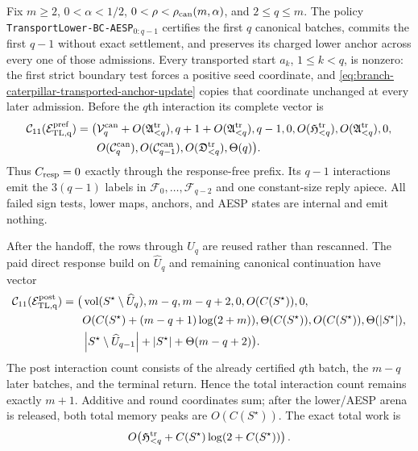 \begin{theorem}
\label{thm:branch-caterpillar-transported-lower-handoff}
Fix $m\geq2$, $0<\alpha<1/2$,
$0<\rho<\rho_{\rm can}(m,\alpha)$, and $2\leq q\leq m$.
The policy
\texttt{TransportLower-BC-AESP}$_{0:q-1}$ certifies the first $q$
canonical batches, commits the first $q-1$ without exact settlement, and
preserves its charged lower anchor across every one of those admissions.
Every transported start $a_k$, $1\leq k<q$, is nonzero: the first strict
boundary test forces a positive seed coordinate, and
\cref{eq:branch-caterpillar-transported-anchor-update} copies that coordinate
unchanged at every later admission.
Before the $q$th interaction its complete vector is
\begin{equation}
 \begin{aligned}
 \mathcal C_{11}(\mathcal E_{\rm TL,q}^{\rm pref})=\bigl(&
 \mathcal V_q^{\rm can}+O(\mathfrak A_{<q}^{\rm tr}),
 q+1+O(\mathfrak A_{<q}^{\rm tr}),q-1,0,
 O(\mathfrak H_{<q}^{\rm tr}),
 O(\mathfrak A_{<q}^{\rm tr}),0,\\
 &O(\mathcal C_q^{\rm can}),
 O(\mathcal C_{q-1}^{\rm can}),
 O(\mathfrak D_{<q}^{\rm tr}),\Theta(q)\bigr).
 \end{aligned}
 \label{eq:branch-caterpillar-transported-lower-prefix-eleven-vector}
\end{equation}
Thus $C_{\rm resp}=0$ exactly through the response-free prefix.  Its
$q-1$ interactions emit the $3(q-1)$ labels in
$\mathcal F_0,\ldots,\mathcal F_{q-2}$ and one constant-size reply apiece.
All failed sign tests, lower maps, anchors, and AESP states are internal and
emit nothing.

After the handoff, the rows through $\widehat U_q$ are reused rather than
rescanned.  The paid direct response build on $\widehat U_q$ and remaining
canonical continuation have vector
\begin{equation}
 \begin{aligned}
 \mathcal C_{11}(\mathcal E_{\rm TL,q}^{\rm post})=\bigl(&
 \operatorname{vol}(S^\star\setminus\widehat U_q),m-q,m-q+2,0,
 O(C(S^\star)),0,\\
 &O(C(S^\star)+(m-q+1)\log(2+m)),
 \Theta(C(S^\star)),O(C(S^\star)),
 \Theta(\left\lvert S^\star \right\rvert),\\
 &\left\lvert S^\star\setminus\widehat U_{q-1} \right\rvert
  +\left\lvert S^\star \right\rvert+\Theta(m-q+2)\bigr).
 \end{aligned}
 \label{eq:branch-caterpillar-transported-lower-post-eleven-vector}
\end{equation}
The post interaction count consists of the already certified $q$th batch,
the $m-q$ later batches, and the terminal return.  Hence the total interaction
count remains exactly $m+1$.  Additive and round coordinates sum; after the
lower/AESP arena is released, both total memory peaks are
$O(C(S^\star))$.  The exact total work is
\begin{equation}
 O\!\left(\mathfrak H_{<q}^{\rm tr}
       +C(S^\star)\log(2+C(S^\star))\right).
 \label{eq:branch-caterpillar-transported-lower-total-work}
\end{equation}


\end{theorem}
